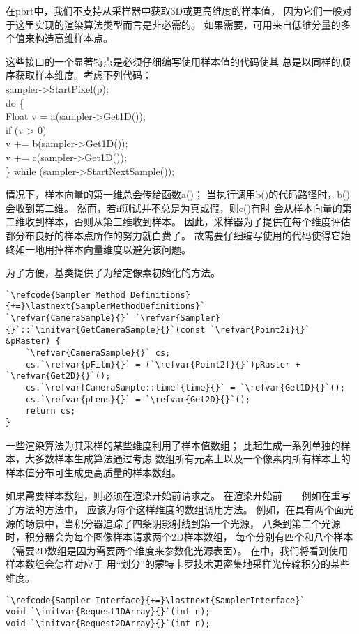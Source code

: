 在pbrt中，我们不支持从采样器中获取3D或更高维度的样本值，
因为它们一般对于这里实现的渲染算法类型而言是非必需的。
如果需要，可用来自低维分量的多个值来构造高维样本点。

这些接口的一个显著特点是必须仔细编写使用样本值的代码使其
总是以同样的顺序获取样本维度。考虑下列代码：\\
{\ttfamily
sampler->StartPixel(p);\\
do \{\\
        \indent Float v = a(sampler->Get1D());\\
        \indent if (v > 0)\\
        \indent \indent v += b(sampler->Get1D());\\
        \indent v += c(sampler->Get1D());\\
\} while (sampler->StartNextSample());
}

情况下，样本向量的第一维总会传给函数{\ttfamily a()}；
当执行调用{\ttfamily b()}的代码路径时，{\ttfamily b()}会收到第二维。
然而，若{\ttfamily if}测试并不总是为真或假，则{\ttfamily c()}有时
会从样本向量的第二维收到样本，否则从第三维收到样本。
因此，采样器为了提供在每个维度评估都分布良好的样本点所作的努力就白费了。
故需要仔细编写使用的代码使得它始终如一地用掉样本向量维度以避免该问题。

为了方便，基类提供了为给定像素初始化的方法。
\begin{lstlisting}
`\refcode{Sampler Method Definitions}{+=}\lastnext{SamplerMethodDefinitions}`
`\refvar{CameraSample}{}` `\refvar{Sampler}{}`::`\initvar{GetCameraSample}{}`(const `\refvar{Point2i}{}` &pRaster) {
    `\refvar{CameraSample}{}` cs;
    cs.`\refvar{pFilm}{}` = (`\refvar{Point2f}{}`)pRaster + `\refvar{Get2D}{}`();
    cs.`\refvar[CameraSample::time]{time}{}` = `\refvar{Get1D}{}`();
    cs.`\refvar{pLens}{}` = `\refvar{Get2D}{}`();
    return cs;
}
\end{lstlisting}

一些渲染算法为其采样的某些维度利用了样本值数组；
比起生成一系列单独的样本，大多数样本生成算法通过考虑
数组所有元素上以及一个像素内所有样本上的样本值分布可生成更高质量的样本数组。

如果需要样本数组，则必须在渲染开始前请求之。
在渲染开始前——例如在重写了方法的方法中，
应该为每个这样维度的数组调用方法。
例如，在具有两个面光源的场景中，当积分器追踪了四条阴影射线到第一个光源，
八条到第二个光源时，积分器会为每个图像样本请求两个2D样本数组，
每个分别有四个和八个样本（需要2D数组是因为需要两个维度来参数化光源表面）。
在中，我们将看到使用样本数组会怎样对应于
用“划分”的蒙特卡罗技术更密集地采样光传输积分的某些维度。
\begin{lstlisting}
`\refcode{Sampler Interface}{+=}\lastnext{SamplerInterface}`
void `\initvar{Request1DArray}{}`(int n);
void `\initvar{Request2DArray}{}`(int n);
\end{lstlisting}

